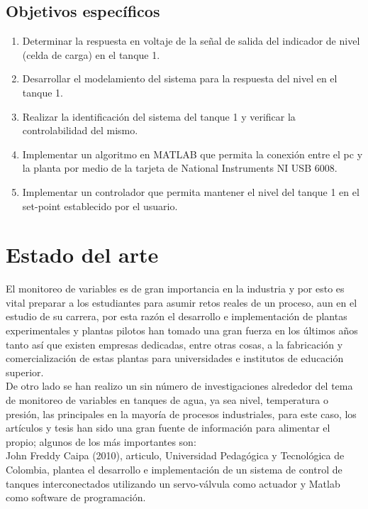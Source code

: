 \documentclass[a4paper,12pt,twoside]{proyectotanquesecci}
\begin{document}
\subsection{Objetivos específicos}

\begin{enumerate}
\item Determinar la respuesta en voltaje de la señal de salida del indicador de nivel (celda de carga) en el tanque 1.
\item Desarrollar el modelamiento del sistema para la respuesta del nivel en el tanque 1.
\item Realizar la identificación del sistema del tanque 1 y verificar la controlabilidad del mismo.
\item Implementar un algoritmo en MATLAB que permita la conexión entre el pc y la planta por medio de la tarjeta de National Instruments NI USB 6008.
\item Implementar un controlador que permita mantener el nivel del tanque 1 en el set-point establecido por el usuario.
\end{enumerate}

	



\newpage

\section{Estado del arte}

El monitoreo de variables es de gran importancia en la industria y por esto es vital preparar a los estudiantes para asumir retos reales de un proceso, aun en el estudio de su carrera, por esta razón el desarrollo e implementación de plantas experimentales y plantas pilotos han tomado una gran fuerza en los últimos años tanto así que existen empresas dedicadas, entre otras cosas, a la fabricación y comercialización de estas plantas para universidades e institutos de educación superior.\\

De otro lado se han realizo un sin número de investigaciones alrededor del tema de monitoreo de variables en tanques de agua, ya sea nivel, temperatura o presión, las principales en la mayoría de procesos industriales, para este caso, los artículos y tesis han sido una gran fuente de información para alimentar el propio; algunos de los más importantes son:\\

John Freddy Caipa (2010), articulo, Universidad Pedagógica y Tecnológica de Colombia, plantea el desarrollo e implementación de un sistema de control de tanques interconectados utilizando un servo-válvula como actuador y Matlab como software de programación.\\
\end{document}
